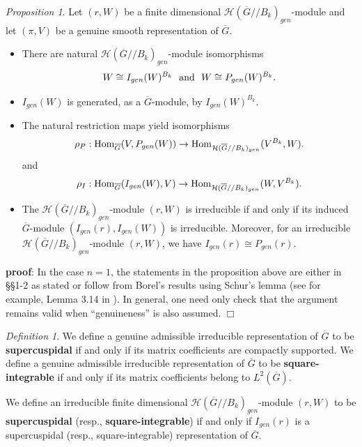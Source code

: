 \documentclass[12pt,letterpaper]{amsart}
\theoremstyle{definition}
\theoremstyle{remark}
\newtheorem{proposition}[theorem]{Proposition}
\newtheorem{definition}[theorem]{Definition}
\begin{document}
\begin{proposition}
\label{prop:borel}
Let $(r,W)$ be a finite dimensional
$\mathcal{H}(\overline{G}//B_k)_{gen}$-module and let
$(\pi,V)$ be a genuine smooth representation of $\overline{G}$.
\begin{itemize}
\item[(a)] 
There are natural $\mathcal{H}(\overline{G}//B_k)_{gen}$-module
isomorphisms
\[
W\cong I_{gen}(W)^{B_k}\ \ 
{\rm and}\ \ W\cong P_{gen}(W)^{B_k}. 
\]
\item[(b)] 
$I_{gen}(W)$ is generated, as a $\overline{G}$-module,
by $I_{gen}(W)^{B_k}$.
\item[(c)]
The natural restriction maps yield isomorphisms
\[
\rho_P : {\rm Hom}_{\overline{G}}(V,P_{gen}(W))
\rightarrow 
 {\rm Hom}_{\mathcal{H}(\overline{G}//B_k)_{gen}}(V^{B_k},W).
\]
and
\[
\rho_I : {\rm Hom}_{\overline{G}}(I_{gen}(W),V)
\rightarrow 
 {\rm Hom}_{\mathcal{H}(\overline{G}//B_k)_{gen}}(W,V^{B_k}).
\]
\item[(d)]
The $\mathcal{H}(\overline{G}//B_k)_{gen}$-module $(r,W)$
is irreducible if and only if its induced $\overline{G}$-module
$(I_{gen}(r),I_{gen}(W))$ is irreducible. Moreover, for an
irreducible $\mathcal{H}(\overline{G}//B_k)_{gen}$-module $(r,W)$,
we have $I_{gen}(r)\cong P_{gen}(r)$.
\end{itemize}
\end{proposition}

{\bf proof}: In the case $n=1$,
the statements in the proposition above are either in \S\S 1-2 \cite{Bo} 
as stated or follow from Borel's results using Schur's lemma
(see for example, Lemma 3.14 in \cite{CR}).
In general, one need only check that the
argument remains valid when ``genuineness'' is also assumed.
$\Box$

\begin{definition} 
We define a genuine
admissible irreducible representation
of $\overline{G}$ to be {\bf supercuspidal} 
if and only if its matrix coefficients are compactly supported.
We define a genuine
admissible irreducible representation
of $\overline{G}$ to be {\bf square-integrable} 
if and only if
its matrix coefficients belong to $L^2(\overline{G})$.

We define an irreducible finite dimensional
$\mathcal{H}(\overline{G}//B_k)_{gen}$-module $(r,W)$ to be 
{\bf supercuspidal} (resp., {\bf square-integrable})
if and only if $I_{gen}(r)$ is a supercuspidal 
(resp., square-integrable) representation of
$\overline{G}$. 
\end{definition} 
\end{document}
